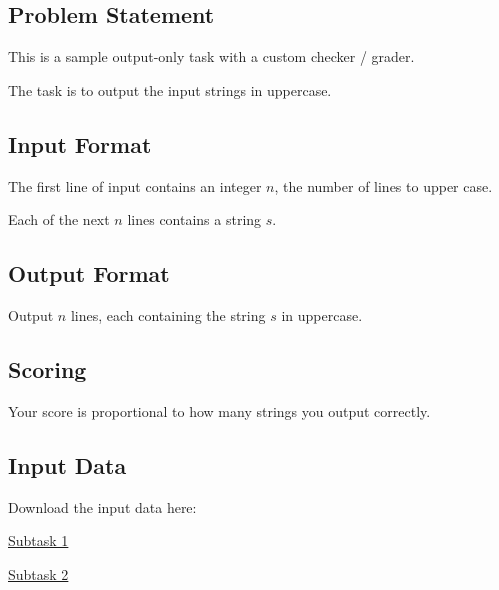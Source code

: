 \subsection*{Problem Statement}

This is a sample output-only task with a custom checker / grader.

The task is to output the input strings in uppercase.

\subsection*{Input Format}

The first line of input contains an integer \(n\), the number of lines to upper case.

Each of the next \(n\) lines contains a string \(s\).

\subsection*{Output Format}

Output \(n\) lines, each containing the string \(s\) in uppercase.

\subsection*{Scoring}

Your score is proportional to how many strings you output correctly.

\subsection*{Input Data}

Download the input data here:

\href{/tasks/output-custom/attachments/output-custom-1.in}{Subtask 1}

\href{/tasks/output-custom/attachments/output-custom-2.in}{Subtask 2}
